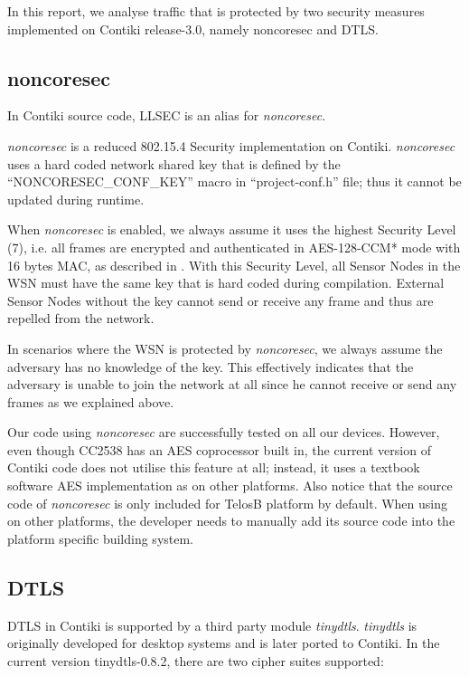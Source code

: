 In this report, we analyse traffic that is protected by two security measures implemented on Contiki release-3.0, namely noncoresec and DTLS.

\subsection{noncoresec} \label{Subsec: noncoresec in experiment}

In Contiki source code, LLSEC is an alias for \textit{noncoresec}.

\textit{noncoresec}\cite{noncoresec}\cite{LLSEC} is a reduced 802.15.4 Security implementation on Contiki. \textit{noncoresec} uses a hard coded network shared key that is defined by the ``NONCORESEC\_CONF\_KEY'' macro in ``project-conf.h'' file; thus it cannot be updated during runtime. 

When \textit{noncoresec} is enabled, we always assume it uses the highest Security Level (7), i.e. all frames are encrypted and authenticated in AES-128-CCM* mode with 16 bytes MAC, as described in . With this Security Level, all Sensor Nodes in the WSN must have the same key that is hard coded during compilation. External Sensor Nodes without the key cannot send or receive any frame and thus are repelled from the network.

In scenarios where the WSN is protected by \textit{noncoresec}, we always assume the adversary has no knowledge of the key. This effectively indicates that the adversary is unable to join the network at all since he cannot receive or send any frames as we explained above.

Our code using \textit{noncoresec} are successfully tested on all our devices. However, even though CC2538 has an AES coprocessor built in, the current version of Contiki code does not utilise this feature at all; instead, it uses a textbook software AES implementation as on other platforms. Also notice that the source code of \textit{noncoresec} is only included for TelosB platform by default. When using on other platforms, the developer needs to manually add its source code into the platform specific building system.

\subsection{DTLS} \label{Subsec: Experiment DTLS}

DTLS in Contiki is supported by a third party module \textit{tinydtls}\cite{tinydtls}. \textit{tinydtls} is originally developed for desktop systems and is later ported to Contiki. In the current version tinydtls-0.8.2, there are two cipher suites supported:

